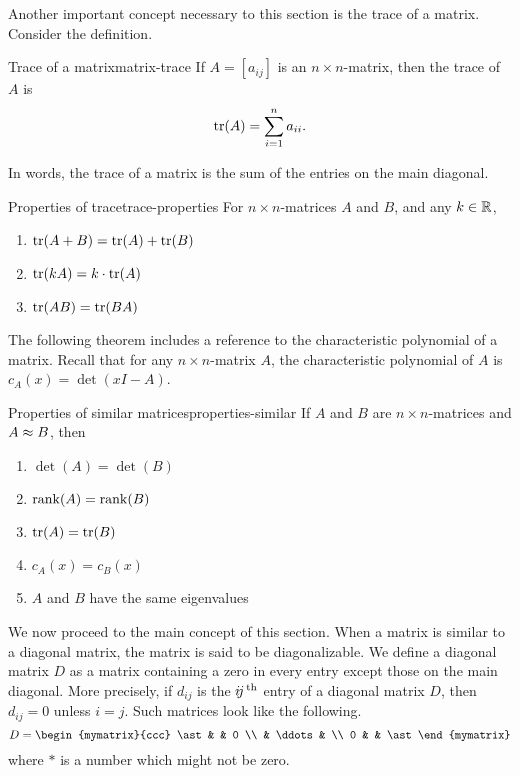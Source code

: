 Another important concept necessary to this section is the trace of a matrix. Consider the definition.

\begin{definition}{Trace of a matrix}{matrix-trace}
%
If $A=[a_{ij}]$ is an $n\times n$-matrix, then the
trace of $A$ is
\[ \tr(A) = \sum_{i=1}^n a_{ii}.\]
\end{definition}

In words, the trace of a matrix is the sum of the entries on the main diagonal. 

\begin{lemma}{Properties of trace}{trace-properties}
For $n\times n$-matrices $A$ and $B$, and any $k\in\mathbb{R}$,
\begin{enumerate}
\item $\tr(A+B)=\tr(A) + \tr(B)$
\item $\tr(kA)=k\cdot\tr(A)$
\item $\tr(AB)=\tr(BA)$
\end{enumerate}
\end{lemma}

The following theorem includes a reference to the characteristic polynomial of a matrix. Recall that for any $n \times n$-matrix $A$, the characteristic polynomial of $A$ is $c_A(x)=\det(xI-A)$.

\begin{theorem}{Properties of similar matrices}{properties-similar}
If $A$ and $B$ are $n\times n$-matrices and $A\approx B$, then
\begin{enumerate}
\item $\det(A) = \det(B)$
\item $\rank(A) = \rank(B)$
\item $\tr(A)= \tr(B)$
\item $c_A(x)=c_B(x)$
\item $A$ and $B$ have the same eigenvalues
\end{enumerate}
\end{theorem}

We now proceed to the main concept of this section. When a matrix is similar to a diagonal matrix, the matrix is said to
be
diagonalizable. 
We define a diagonal matrix $D$ as a matrix containing a zero in every entry 
except those on the main diagonal. More precisely, if $d_{ij}$ is the $i\!j^{\,\rm th}$ entry of a diagonal matrix $D$, then
$d_{ij}=0$ unless $i=j$. Such
matrices look like the following.
\begin{equation*}
D = \begin{mymatrix}{ccc}
\ast &  & 0 \\
& \ddots &  \\
0 &  & \ast
\end{mymatrix}
\end{equation*}
where $\ast $ is a number which might not be zero.

